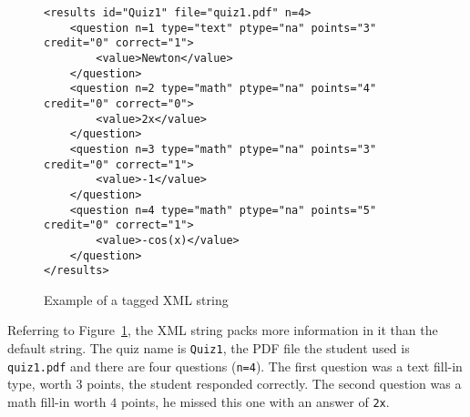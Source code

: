 \documentclass{article}
\def\PDF{PDF}\def\URL{URL}
\begin{document}
\begin{figure}[htb]
\begin{minipage}{5.45in}
\begin{Verbatim}[fontsize=\small]
<results id="Quiz1" file="quiz1.pdf" n=4>
    <question n=1 type="text" ptype="na" points="3" credit="0" correct="1">
        <value>Newton</value>
    </question>
    <question n=2 type="math" ptype="na" points="4" credit="0" correct="0">
        <value>2x</value>
    </question>
    <question n=3 type="math" ptype="na" points="3" credit="0" correct="1">
        <value>-1</value>
    </question>
    <question n=4 type="math" ptype="na" points="5" credit="0" correct="1">
        <value>-cos(x)</value>
    </question>
</results>
\end{Verbatim}
\end{minipage}%
\caption{Example of a tagged XML string}\label{fig:tagXML}
\end{figure}

Referring to Figure~\ref{fig:tagXML}, the XML string packs
more information in it than the default string. The quiz name is
\texttt{Quiz1}, the {\PDF} file the student used is \texttt{quiz1.pdf} and
there are four questions (\texttt{n=4}).  The first question was a text
fill-in type, worth $3$ points, the student responded correctly. The second
question was a math fill-in worth $4$ points, he missed this one with an
answer of \texttt{2x}.
\end{document}
